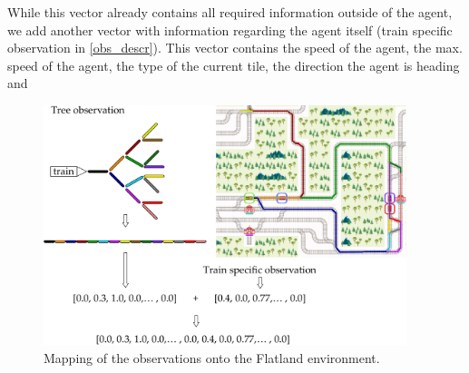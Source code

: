 While this vector already contains all required information outside of the agent, we add another vector with information regarding the agent itself (train specific observation in \autoref{obs_descr}). This vector contains the speed of the agent, the max. speed of the agent, the type of the current tile, the direction the agent is heading and 

\begin{figure}
	\centering
	\includegraphics[width=300pt]{diagrams/tree_obs_mapping.pdf}
	\caption{Mapping of the observations onto the Flatland environment.}
\end{figure}

